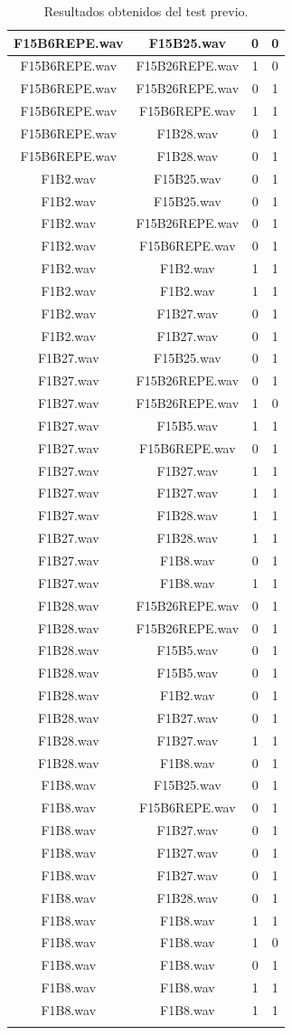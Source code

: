 \documentclass[11pt,a4paper]{book}
\begin{document}
\begin{longtable}[c]{|c|c|c|c|}
F15B6REPE.wav&F15B25.wav&0&0\\ \hline
F15B6REPE.wav&F15B26REPE.wav&1&0\\ \hline
F15B6REPE.wav&F15B26REPE.wav&0&1\\ \hline
F15B6REPE.wav&F15B6REPE.wav&1&1\\ \hline
F15B6REPE.wav&F1B28.wav&0&1\\ \hline
F15B6REPE.wav&F1B28.wav&0&1\\ \hline
F1B2.wav&F15B25.wav&0&1\\ \hline
F1B2.wav&F15B25.wav&0&1\\ \hline
F1B2.wav&F15B26REPE.wav&0&1\\ \hline
F1B2.wav&F15B6REPE.wav&0&1\\ \hline
F1B2.wav&F1B2.wav&1&1\\ \hline
F1B2.wav&F1B2.wav&1&1\\ \hline
F1B2.wav&F1B27.wav&0&1\\ \hline
F1B2.wav&F1B27.wav&0&1\\ \hline
F1B27.wav&F15B25.wav&0&1\\ \hline
F1B27.wav&F15B26REPE.wav&0&1\\ \hline
F1B27.wav&F15B26REPE.wav&1&0\\ \hline
F1B27.wav&F15B5.wav&1&1\\ \hline
F1B27.wav&F15B6REPE.wav&0&1\\ \hline
F1B27.wav&F1B27.wav&1&1\\ \hline
F1B27.wav&F1B27.wav&1&1\\ \hline
F1B27.wav&F1B28.wav&1&1\\ \hline
F1B27.wav&F1B28.wav&1&1\\ \hline
F1B27.wav&F1B8.wav&0&1\\ \hline
F1B27.wav&F1B8.wav&1&1\\ \hline
F1B28.wav&F15B26REPE.wav&0&1\\ \hline
F1B28.wav&F15B26REPE.wav&0&1\\ \hline
F1B28.wav&F15B5.wav&0&1\\ \hline
F1B28.wav&F15B5.wav&0&1\\ \hline
F1B28.wav&F1B2.wav&0&1\\ \hline
F1B28.wav&F1B27.wav&0&1\\ \hline
F1B28.wav&F1B27.wav&1&1\\ \hline
F1B28.wav&F1B8.wav&0&1\\ \hline
F1B8.wav&F15B25.wav&0&1\\ \hline
F1B8.wav&F15B6REPE.wav&0&1\\ \hline
F1B8.wav&F1B27.wav&0&1\\ \hline
F1B8.wav&F1B27.wav&0&1\\ \hline
F1B8.wav&F1B27.wav&0&1\\ \hline
F1B8.wav&F1B28.wav&0&1\\ \hline
F1B8.wav&F1B8.wav&1&1\\ \hline
F1B8.wav&F1B8.wav&1&0\\ \hline
F1B8.wav&F1B8.wav&0&1\\ \hline
F1B8.wav&F1B8.wav&1&1\\ \hline
F1B8.wav&F1B8.wav&1&1\\ \hline
\caption{Resultados obtenidos del test previo.} 
\end{longtable}
\end{document}
